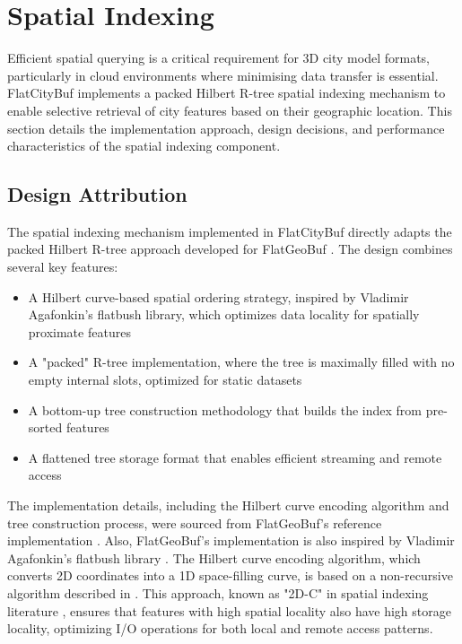 
\section{Spatial Indexing}
\label{methodology:spatial_index}

Efficient spatial querying is a critical requirement for 3D city model formats, particularly in cloud environments where minimising data transfer is essential. FlatCityBuf implements a packed Hilbert R-tree spatial indexing mechanism \citep{Roussopoulos_Leifker_1985} to enable selective retrieval of city features based on their geographic location. This section details the implementation approach, design decisions, and performance characteristics of the spatial indexing component.

\subsection{Design Attribution}
\label{methodology:spatial_index:attribution}

The spatial indexing mechanism implemented in FlatCityBuf directly adapts the packed Hilbert R-tree approach developed for FlatGeoBuf \citep{horance_2022_detail}. The design combines several key features:

\begin{itemize}
  \item A Hilbert curve-based spatial ordering strategy, inspired by Vladimir Agafonkin's flatbush library, which optimizes data locality for spatially proximate features
  \item A "packed" R-tree implementation, where the tree is maximally filled with no empty internal slots, optimized for static datasets
  \item A bottom-up tree construction methodology that builds the index from pre-sorted features
  \item A flattened tree storage format that enables efficient streaming and remote access
\end{itemize}

The implementation details, including the Hilbert curve encoding algorithm and tree construction process, were sourced from FlatGeoBuf's reference implementation \citep{flatgeobuf_github}. Also, FlatGeoBuf's implementation is also inspired by Vladimir Agafonkin's flatbush library \citep{vladimir_2018}. The Hilbert curve encoding algorithm, which converts 2D coordinates into a 1D space-filling curve, is based on a non-recursive algorithm described in \citet{hacker_delight_2012}. This approach, known as "2D-C" in spatial indexing literature \citep{hacker_delight_2012}, ensures that features with high spatial locality also have high storage locality, optimizing I/O operations for both local and remote access patterns.


